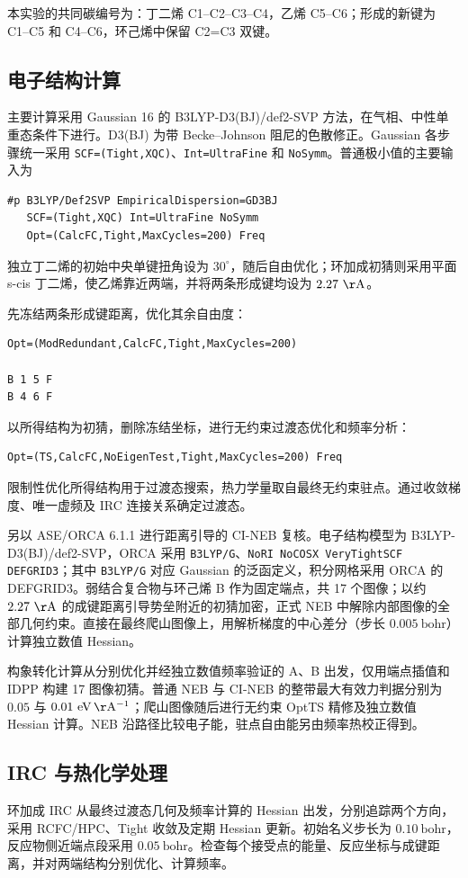 \documentclass[a4paper,12pt]{article}
\begin{document}
本实验的共同碳编号为：丁二烯 C1--C2--C3--C4，乙烯 C5--C6；形成的新键为 C1--C5 和 C4--C6，环己烯中保留 C2=C3 双键。

\subsection{电子结构计算}
主要计算采用 Gaussian 16 的 B3LYP-D3(BJ)/def2-SVP 方法，在气相、中性单重态条件下进行。D3(BJ) 为带 Becke--Johnson 阻尼的色散修正。Gaussian 各步骤统一采用 \texttt{SCF=(Tight,XQC)}、\texttt{Int=UltraFine} 和 \texttt{NoSymm}。普通极小值的主要输入为
\begin{lstlisting}
#p B3LYP/Def2SVP EmpiricalDispersion=GD3BJ
   SCF=(Tight,XQC) Int=UltraFine NoSymm
   Opt=(CalcFC,Tight,MaxCycles=200) Freq
\end{lstlisting}
独立丁二烯的初始中央单键扭角设为 $30^\circ$，随后自由优化；环加成初猜则采用平面 s-cis 丁二烯，使乙烯靠近两端，并将两条形成键均设为 $2.27\ \mathrm{\AA}$。

先冻结两条形成键距离，优化其余自由度：
\begin{lstlisting}
Opt=(ModRedundant,CalcFC,Tight,MaxCycles=200)

B 1 5 F
B 4 6 F
\end{lstlisting}
以所得结构为初猜，删除冻结坐标，进行无约束过渡态优化和频率分析：
\begin{lstlisting}
Opt=(TS,CalcFC,NoEigenTest,Tight,MaxCycles=200) Freq
\end{lstlisting}
限制性优化所得结构用于过渡态搜索，热力学量取自最终无约束驻点。通过收敛梯度、唯一虚频及 IRC 连接关系确定过渡态。

另以 ASE/ORCA 6.1.1 进行距离引导的 CI-NEB 复核。电子结构模型为 B3LYP-D3(BJ)/def2-SVP，ORCA 采用 \texttt{B3LYP/G}、\texttt{NoRI NoCOSX VeryTightSCF DEFGRID3}；其中 \texttt{B3LYP/G} 对应 Gaussian 的泛函定义，积分网格采用 ORCA 的 DEFGRID3\cite{orca-dft}。弱结合复合物与环己烯 B 作为固定端点，共 17 个图像；以约 $2.27\ \mathrm{\AA}$ 的成键距离引导势垒附近的初猜加密，正式 NEB 中解除内部图像的全部几何约束。直接在最终爬山图像上，用解析梯度的中心差分（步长 $0.005\ \mathrm{bohr}$）计算独立数值 Hessian\cite{orca-freq}。

构象转化计算从分别优化并经独立数值频率验证的 A、B 出发，仅用端点插值和 IDPP 构建 17 图像初猜。普通 NEB 与 CI-NEB 的整带最大有效力判据分别为 $0.05$ 与 $0.01\ \mathrm{eV\,\AA^{-1}}$；爬山图像随后进行无约束 OptTS 精修及独立数值 Hessian 计算。NEB 沿路径比较电子能，驻点自由能另由频率热校正得到。

\subsection{IRC 与热化学处理}
环加成 IRC 从最终过渡态几何及频率计算的 Hessian 出发，分别追踪两个方向，采用 RCFC/HPC、Tight 收敛及定期 Hessian 更新。初始名义步长为 $0.10\ \mathrm{bohr}$，反应物侧近端点段采用 $0.05\ \mathrm{bohr}$。检查每个接受点的能量、反应坐标与成键距离，并对两端结构分别优化、计算频率。
\end{document}
